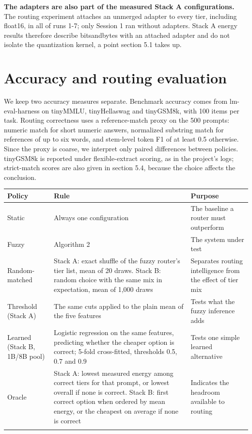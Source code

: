\textbf{The adapters are also part of the measured Stack A configurations.} The routing experiment attaches an unmerged adapter to every tier, including float16, in all of runs 1-7; only Session 1 ran without adapters. Stack A energy results therefore describe bitsandbytes with an attached adapter and do not isolate the quantization kernel, a point section 5.1 takes up.

\section{Accuracy and routing evaluation}
We keep two accuracy measures separate. Benchmark accuracy comes from lm-eval-harness on tinyMMLU, tinyHellaswag and tinyGSM8k, with 100 items per task. Routing correctness uses a reference-match proxy on the 500 prompts: numeric match for short numeric answers, normalized substring match for references of up to six words, and stem-level token F1 of at least 0.5 otherwise. Since the proxy is coarse, we interpret only paired differences between policies. tinyGSM8k is reported under flexible-extract scoring, as in the project's logs; strict-match scores are also given in section 5.4, because the choice affects the conclusion.


\begingroup\footnotesize\setlength{\tabcolsep}{4pt}
\begin{longtable}{>{\raggedright\arraybackslash}p{38.3mm}>{\raggedright\arraybackslash}p{59.3mm}>{\raggedright\arraybackslash}p{44.0mm}}
\toprule
\textbf{Policy} & \textbf{Rule} & \textbf{Purpose} \\
\midrule
\endhead
Static & Always one configuration & The baseline a router must outperform \\*
Fuzzy & Algorithm 2 & The system under test \\*
Random-matched & Stack A: exact shuffle of the fuzzy router's tier list, mean of 20 draws. Stack B: random choice with the same mix in expectation, mean of 1,000 draws & Separates routing intelligence from the effect of tier mix \\*
Threshold (Stack A) & The same cuts applied to the plain mean of the five features & Tests what the fuzzy inference adds \\*
Learned (Stack B, 1B/8B pool) & Logistic regression on the same features, predicting whether the cheaper option is correct; 5-fold cross-fitted, thresholds 0.5, 0.7 and 0.9 & Tests one simple learned alternative \\*
Oracle & Stack A: lowest measured energy among correct tiers for that prompt, or lowest overall if none is correct. Stack B: first correct option when ordered by mean energy, or the cheapest on average if none is correct & Indicates the headroom available to routing \\*
\bottomrule\noalign{\nobreak}
\end{longtable}
\addtocounter{table}{-1}
\endgroup

